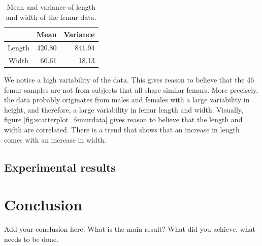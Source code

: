 \documentclass[10pt]{article}
\begin{document}
\begin{table}[h!]
\centering
\begin{tabular}{c|r|r}
 & Mean & Variance \\
\hline
Length & 420.80 & 841.94 \\
Width & 60.61 & 18.13
\end{tabular}
\caption{Mean and variance of length and width of the femur data.}
\label{table:mean_variance_femur_data}
\end{table}

\noindent
We notice a high variability of the data. This gives reason to believe that the 46 femur samples are not from subjects that all share similar femurs. More precisely, the data probably originates from males and females with a large variability in height, and therefore, a large variability in femur length and width. Visually, figure \ref{fig:scatterplot_femurdata} gives reason to believe that the length and width are correlated. There is a trend that shows that an increase in length comes with an increase in width.





\newpage
\subsection{Experimental results}

\newpage
\section{Conclusion}

Add your conclusion here. What is the main result? What did you achieve, what 
needs to be done. 
\end{document}
